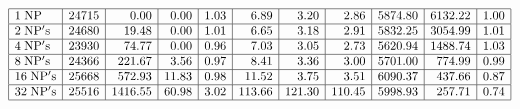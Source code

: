 \documentclass[headrule,landscape]{foils}
\begin{document}
{$$\begin{array}{|l|r|r|r|r|r|r|r|r|r|r|}
\hline
{\rm 1\;NP} & 24715 & 0.00 & 0.00 & 1.03 & 6.89 & 3.20 & 2.86 & 5874.80 &
6132.22 & 1.00 \\
\hline
{\rm 2\;NP's} & 24680 & 19.48 & 0.00 & 1.01 & 6.65 & 3.18 & 2.91 & 5832.25 &
3054.99 & 1.01 \\
\hline
{\rm 4\;NP's} & 23930 & 74.77 & 0.00 & 0.96 & 7.03 & 3.05 & 2.73 & 5620.94 &
1488.74 & 1.03 \\
\hline
{\rm 8\;NP's} & 24366 & 221.67 & 3.56 & 0.97 & 8.41 & 3.36 & 3.00 & 5701.00 &
774.99 & 0.99 \\
\hline
{\rm 16\;NP's} & 25668 & 572.93 & 11.83 & 0.98 & 11.52 & 3.75 & 3.51 & 6090.37
& 437.66 & 0.87 \\
\hline
{\rm 32\;NP's} & 25516 & 1416.55 & 60.98 & 3.02 & 113.66 & 121.30 & 110.45 &
5998.93 & 257.71 & 0.74 \\
\hline
\end{array}
$$
}

\end{document}
